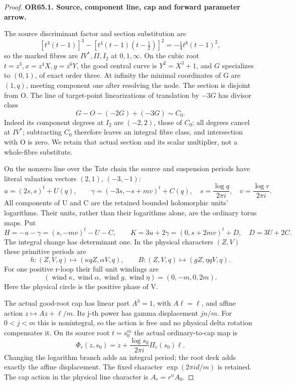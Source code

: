 \begin{proof}
\par\medskip\noindent\textbf{OR65.1. Source, component line, cap and forward parameter arrow.}\par\nopagebreak[4]

The source discriminant factor and section substitution are
\[
 [t^3(t-1)]^3-[t^4(t-1)(t-\tfrac12)]^2
       =-\tfrac14t^8(t-1)^2,
\]
so the marked fibres are \(IV^*,II,I_2\) at \(0,1,\infty\).
On the cubic root \(t=z^3,x=z^4X,y=z^6Y\), the good central
curve is \(Y^2=X^3+1\), and \(G\) specializes to \((0,1)\),
of exact order three. At infinity the minimal coordinates of G
are \((1,q)\), meeting component one after resolving the node.
The section is disjoint from O. The line of target-point
linearizations of translation by \(-3G\) has divisor class
\[
 G-O-(-2G)+(-3G)\sim C_0.
\]
Indeed its component degrees at \(I_2\) are \((-2,2)\), those of
\(C_0\); all degrees cancel at \(IV^*\); subtracting \(C_0\)
therefore leaves an integral fibre class, and intersection with O
is zero. We retain that actual section and its scalar multiplier,
not a whole-fibre substitute.

On the nonzero line over the Tate chain the source and suspension
periods have literal valuation vectors \((2,1)\), \((-3,-1)\):
\[
 u=(2s,s)^t+U(q),\qquad
 \gamma=(-3s,-s+mv)^t+C(q),
 \quad s=\frac{\log q}{2\pi i},\quad
 v=\frac{\log r}{2\pi i}.                            \tag{P3K.65.OR.2}
\]
All components of U and C are the retained bounded holomorphic
units' logarithms. Their units, rather than their logarithms
alone, are the ordinary torus maps. Put
\[
 H=-u-\gamma=(s,-mv)^t-U-C,\qquad
 K=3u+2\gamma=(0,s+2mv)^t+D,\quad D=3U+2C.
\]
The integral change has determinant one. In the physical characters
\((Z,V)\) these primitive periods are
\[
 h:(Z,V,q)\mapsto(\kappa q Z,\alpha V,q),\qquad
 B:(Z,V,q)\mapsto(gZ,\eta qV,q).                     \tag{P3K.65.OR.3}
\]
For one positive r-loop their full unit windings are
\[
  (\operatorname{wind}\kappa,\operatorname{wind}\alpha,
    \operatorname{wind}g,\operatorname{wind}\eta)
                         =(0,-m,0,2m).              \tag{P3K.65.OR.4}
\]
Here the physical circle is the positive phase of V.

The actual good-root cap has linear part \(A^3=1\), with
\(A\ell=\ell\), and affine action
\(z\mapsto Az+\ell/m\). Its j-th power has gamma displacement
\(jn/m\). For \(0<j<m\) this is nonintegral, so the action is
free and no physical delta rotation compensates it. On its source
root \(t=s_0^m\) the actual ordinary-to-cap map is
\[
 \Phi_r(z,s_0)=z+\frac{\log s_0}{2\pi i}\Pi_r(s_0)\ell.
                                                               \tag{P3K.65.OR.5}
\]
Changing the logarithm branch adds an integral period; the root
deck adds exactly the affine displacement. The fixed character
\(\exp(2\pi i d/m)\) is retained. The cap action in the physical
line character is \(A_r=r^nA_0\).


\end{proof}
